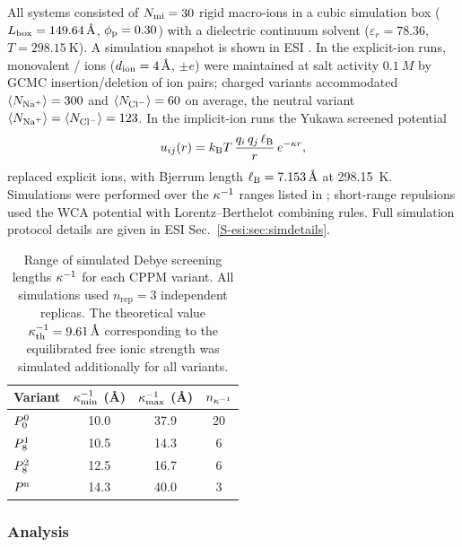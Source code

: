 \documentclass{article}
\begin{document}
All systems consisted of $N_{\mathrm{mi}} = 30$ rigid macro-ions in a cubic simulation box ($L_\mathrm{box} = \qty{149.64}{\angstrom}$, $\phi_\mathrm{p} = 0.30$) with a dielectric continuum solvent ($\varepsilon_r = 78.36$, $T = \qty{298.15}{\kelvin}$).
A simulation snapshot is shown in ESI .
In the explicit-ion runs, monovalent / ions ($d_{\mathrm{ion}} = \qty{4}{\angstrom}$, $\pm e$) were maintained at salt activity $\qty{0.1}{M}$ by GCMC insertion/deletion of ion pairs; charged variants accommodated $\langle\nna\rangle = 300$ and $\langle\ncl\rangle = 60$ on average, the neutral variant $\langle\nna\rangle = \langle\ncl\rangle = 123$.
In the implicit-ion runs the Yukawa screened potential
\begin{equation}
    u_{ij}(r) = k_{\rm B}T \, \frac{q_i \, q_j \, \ell_{\rm B}}{r} \, e^{-\kappa r},
    \label{eq:yukawa}
\end{equation}
replaced explicit ions, with Bjerrum length $\ell_{\rm B} = \qty{7.153}{\angstrom}$ at \qty{298.15}{\kelvin}.
Simulations were performed over the $\kappa^{-1}$ ranges listed in ; short-range repulsions used the WCA potential with Lorentz--Berthelot combining rules.
Full simulation protocol details are given in ESI Sec.~\ref{S-esi:sec:simdetails}.

\begin{table}[htbp]
    \centering
    \caption{Range of simulated Debye screening lengths $\kappa^{-1}$ for each CPPM variant. All simulations used $n_\text{rep} = 3$ independent replicas. The theoretical value $\kappa^{-1}_\mathrm{th} = \qty{9.61}{\angstrom}$ corresponding to the equilibrated free ionic strength was simulated additionally for all variants.}
    \label{tab:kappa}
    \begin{tabular}{lccc}
        \toprule
        Variant & $\kappa^{-1}_\text{min}$ (\AA) &
                  $\kappa^{-1}_\text{max}$ (\AA) &
                  $n_{\kappa^{-1}}$ \\
        \midrule
        $P^{0}_{0}$  & 10.0 & 37.9 & 20 \\
        $P^{1}_{8}$  & 10.5 & 14.3 &  6 \\
        $P^{2}_{8}$  & 12.5 & 16.7 &  6 \\
        $P^\mathrm{n}$   & 14.3 & 40.0 &  3 \\
        \bottomrule
    \end{tabular}
\end{table}

\subsubsection{Analysis}
\end{document}
